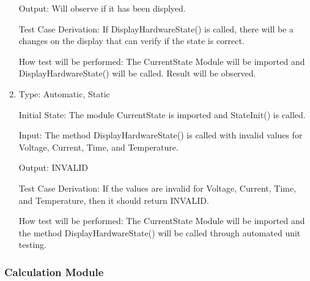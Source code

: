 \documentclass[12pt, titlepage]{article}
\begin{document}
\begin{enumerate}[{UT-CS}1.]
Output: Will observe if it has been displyed.

Test Case Derivation: If DisplayHardwareState() is called, there will be a changes on the display that can verify if the state is correct.


How test will be performed: The CurrentState Module will be imported and DisplayHardwareState() will be called. Result will be observed.

\item

Type: Automatic, Static
					
Initial State: The module CurrentState is imported and StateInit() is called.
					
Input: The method DisplayHardwareState() is called with invalid values for Voltage, Current, Time, and Temperature.
					
Output: INVALID

Test Case Derivation: If the values are invalid for Voltage, Current, Time, and Temperature, then it should return INVALID.

How test will be performed: The CurrentState Module will be imported and the method DisplayHardwareState() will be called through automated unit testing.

    
\end{enumerate}

\subsubsection{Calculation Module }
\end{document}
